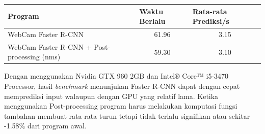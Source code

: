 \documentclass{article}
\begin{document}
  \begin{table}[H]
	\centering
	\begin{tabular}{lcc}
	\hline
	Program                                     & \multicolumn{1}{l}{Waktu Berlalu} & \multicolumn{1}{l}{Rata-rata Prediksi/s} \\ \hline
	WebCam Faster R-CNN                         & 61.96                             & 3.15                                     \\
	WebCam Faster R-CNN + Post-processing (nms) & 59.30                             & 3.10                                    
	\end{tabular}
	\end{table}

  Dengan menggunakan Nvidia GTX 960 2GB dan Intel® Core™ i5-3470 Processor, hasil \textit{benchmark} menunjukan Faster R-CNN dapat dengan cepat memprediksi input walaupun dengan GPU yang relatif lama. Ketika menggunakan Post-processing program harus melakukan komputasi fungsi tambahan membuat rata-rata turun tetapi tidak terlalu signifikan atau sekitar -1.58\% dari program awal. 
\end{document}

